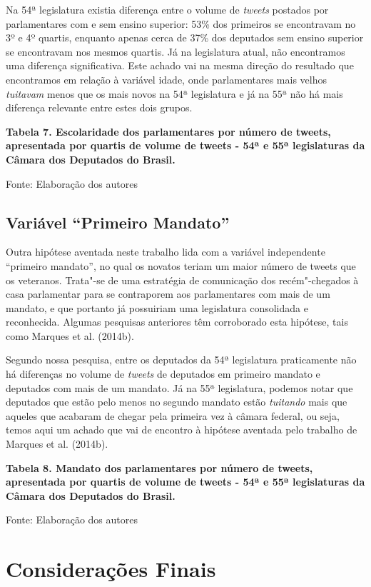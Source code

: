 Na 54ª legislatura existia diferença entre o volume de \emph{tweets}
postados por parlamentares com e sem ensino superior: 53\% dos primeiros
se encontravam no 3º e 4º quartis, enquanto apenas cerca de 37\% dos
deputados sem ensino superior se encontravam nos mesmos quartis. Já na
legislatura atual, não encontramos uma diferença significativa. Este
achado vai na mesma direção do resultado que encontramos em relação à
variável idade, onde parlamentares mais velhos \emph{tuitavam} menos que
os mais novos na 54ª legislatura e já na 55ª não há mais diferença
relevante entre estes dois grupos.

\textbf{Tabela 7. Escolaridade dos parlamentares por número de tweets,
apresentada por quartis de volume de tweets - 54ª e 55ª legislaturas da
Câmara dos Deputados do Brasil.}

Fonte: Elaboração dos autores

\subsection{Variável ``Primeiro Mandato''}

Outra hipótese aventada neste trabalho lida com a variável independente
``primeiro mandato'', no qual os novatos teriam um maior número de
tweets que os veteranos. Trata"-se de uma estratégia de comunicação dos
recém"-chegados à casa parlamentar para se contraporem aos parlamentares
com mais de um mandato, e que portanto já possuiriam uma legislatura
consolidada e reconhecida. Algumas pesquisas anteriores têm corroborado
esta hipótese, tais como Marques et al. (2014b).

Segundo nossa pesquisa, entre os deputados da 54ª legislatura
praticamente não há diferenças no volume de \emph{tweets} de deputados
em primeiro mandato e deputados com mais de um mandato. Já na 55ª
legislatura, podemos notar que deputados que estão pelo menos no segundo
mandato estão \emph{tuitando} mais que aqueles que acabaram de chegar
pela primeira vez à câmara federal, ou seja, temos aqui um achado que
vai de encontro à hipótese aventada pelo trabalho de Marques et al.
(2014b).

\textbf{Tabela 8. Mandato dos parlamentares por número de tweets,
apresentada por quartis de volume de tweets - 54ª e 55ª legislaturas da
Câmara dos Deputados do Brasil.}

Fonte: Elaboração dos autores

\section{Considerações Finais}

